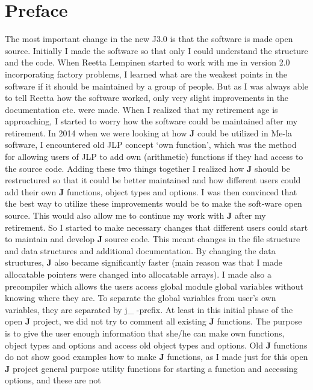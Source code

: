 \section*{Preface}  %
\label{preface}
The most important change in the new J3.0 is that the software is made
open source. Initially I made the software so that only I could understand
the structure and the code. When Reetta Lempinen started to work with me
in version 2.0 incorporating factory problems, I learned what are the
weakest points in the software if it should be maintained by a group of
people. But as I was always able to tell Reetta how the software worked,
only very slight improvements in the documentation etc. were made.
When I realized that my retirement age is approaching, I started to worry
how the software could be maintained after my retirement. In 2014
when we were looking at how \textbf{J} could be utilized in Me-la software,
I encountered old JLP concept ‘own function’, which was the method
for allowing users of JLP to add own (arithmetic) functions if they
had access to the source code. Adding these two things together
I realized how \textbf{J} should be restructured so that it could be better
maintained and how different users could add their own \textbf{J} functions,
object types and options.
I was then convinced that the best way to utilize these improvements
would be to make the soft-ware open source. This would also allow me
to continue my work with \textbf{J} after my retirement. So I started to make
necessary changes that different users could start to maintain and
develop \textbf{J} source code. This meant changes in the file structure and
data structures and additional documentation. By changing the data
structures, \textbf{J} also became significantly faster (main reason was that
I made allocatable pointers were changed into allocatable arrays).
I made also a precompiler which allows the users access global module
global variables without knowing where they are. To separate the
global variables from user’s own variables, they are separated
by j\_ -prefix.
At least in this initial phase of the open \textbf{J} project, we did not
try to comment all existing \textbf{J} functions. The purpose is to give the
user enough information that she/he can make own functions, object
types and options and access old object types and options.  Old \textbf{J}
functions do not show good examples how to make \textbf{J} functions, as I
made just for this open \textbf{J} project general purpose utility functions
for starting a function and accessing options, and these are not
